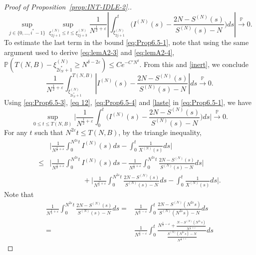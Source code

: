 \documentclass[11pt, reqno]{article}
\numberwithin{equation}{section}
\numberwithin{theorem}{section}
\newcommand{\pto}{\ensuremath{\xrightarrow{\ \mathbb{P}\ }}}  %
\begin{document}
\begin{proof}[Proof of Proposition~\ref{prop:INT-IDLE-2}.]
\begin{equation}\label{eq:Prop6.5-4}
    \sup_{j\in\{0,...,i^*-1\}}\sup_{\xi^{(N)}_{2j+1}\leq t\leq\xi^{(N)}_{2j+3} }\frac{1}{N^{\frac{1}{2}+\varepsilon}}\left|\int_{\xi^{(N)}_{2j+1}}^{t}\Big(I^{(N)}(s)-\frac{2N-S^{(N)}(s)}{S^{(N)}(s)-N}\Big)ds\right|\pto0.
\end{equation}
To estimate the last term in the bound \eqref{eq:Prop6.5-1}, note that using the same argument used to derive \eqref{eq:lemA2-3} and \eqref{eq:lemA2-4},
$
\mathbb{P}\left(T(N,B) - \xi^{(N)}_{2i^*_N + 1} \ge N^{\delta-2\varepsilon}\right)\leq Ce^{-C'N^{\delta}}.
$
From this and \eqref{inert}, we conclude
\begin{equation}\label{laste}
 \frac{1}{N^{\frac{1}{2}+\varepsilon}}\int_{\xi^{(N)}_{2i^*_N+1}}^{T(N,B)}\left| I^{(N)}(s)-\frac{2N-S^{(N)}(s)}{S^{(N)}(s)-N}\right| ds \pto0.
\end{equation}
Using \eqref{eq:Prop6.5-3}, \eqref{eq 12}, \eqref{eq:Prop6.5-4} and \eqref{laste} in \eqref{eq:Prop6.5-1}, we have
\begin{equation}\label{eq:Prop6.5-5}
    \sup_{0\leq t\leq T(N,B)}\Big|\frac{1}{N^{\frac{1}{2}+\varepsilon}}\int_0^{t}\Big(I^{(N)}(s)-\frac{2N-S^{(N)}(s)}{S^{(N)}(s)-N}\Big)ds\Big|\pto0.
\end{equation}
For any $t$ such that $N^{2\varepsilon}t\leq T(N,B)$, by the triangle inequality,
\begin{equation}
\begin{split}
    &\Big|\frac{1}{N^{\frac{1}{2}+\varepsilon}} \int_0^{N^{2\varepsilon}t} I^{(N)}(s)ds-\int_0^t\frac{1}{X^{(N)}(s)}ds\Big|\\
    \leq& \Big|\frac{1}{N^{\frac{1}{2}+\varepsilon}} \int_0^{N^{2\varepsilon}t} I^{(N)}(s)ds-\frac{1}{N^{\frac{1}{2}+\varepsilon}}\int_0^{N^{2\varepsilon}t}\frac{2N-S^{(N)}(s)}{S^{(N)}(s)-N}ds\Big|\\
    &\hspace{2cm}+\Big|\frac{1}{N^{\frac{1}{2}+\varepsilon}}\int_0^{N^{2\varepsilon}t}\frac{2N-S^{(N)}(s)}{S^{(N)}(s)-N}ds-\int_0^t\frac{1}{X^{(N)}(s)}ds\Big|\label{limit of 1/X^N}.
\end{split}
\end{equation}
Note that
\begin{align*}
    \frac{1}{N^{\frac{1}{2}+\varepsilon}}\int_0^{N^{2\varepsilon}t}\frac{2N-S^{(N)}(s)}{S^{(N)}(s)-N}ds
    =&\frac{1}{N^{\frac{1}{2}-\varepsilon}}\int_0^t \frac{2N-S^{(N)}(N^{2\varepsilon}s)}{S^{(N)}(N^{2\varepsilon}s)-N}ds\\
    =&\frac{1}{N^{\frac{1}{2}-\varepsilon}}\int_0^t \frac{N^{\frac{1}{2}-\varepsilon}+\frac{N-S^{(N)}(N^{2\varepsilon}s)}{N^{\frac{1}{2}+\varepsilon}}}{\frac{S^{(N)}(N^{2\varepsilon}s)-N}{N^{\frac{1}{2}+\varepsilon}}}ds

\end{align*}
\end{proof}
\end{document}

